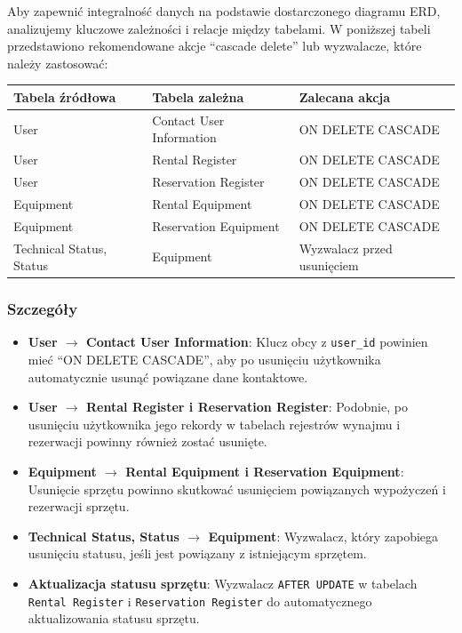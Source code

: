 \documentclass{article}
\begin{document}
Aby zapewnić integralność danych na podstawie dostarczonego diagramu ERD, analizujemy kluczowe zależności i relacje między tabelami. W poniższej tabeli przedstawiono rekomendowane akcje ``cascade delete'' lub wyzwalacze, które należy zastosować:

\begin{table}[h!]
    \centering
    \begin{tabular}{|p{4cm}|p{4cm}|p{6cm}|}
        \hline
        \textbf{Tabela źródłowa} & \textbf{Tabela zależna} & \textbf{Zalecana akcja} \\
        \hline
        User & Contact User Information & ON DELETE CASCADE \\
        \hline
        User & Rental Register & ON DELETE CASCADE \\
        \hline
        User & Reservation Register & ON DELETE CASCADE \\
        \hline
        Equipment & Rental Equipment & ON DELETE CASCADE \\
        \hline
        Equipment & Reservation Equipment & ON DELETE CASCADE \\
        \hline
        Technical Status, Status & Equipment & Wyzwalacz przed usunięciem \\
        \hline
    \end{tabular}
\end{table}

\subsubsection{Szczegóły}

\begin{itemize}
    \item \textbf{User $\rightarrow$ Contact User Information}: Klucz obcy z \texttt{user\_id} powinien mieć ``ON DELETE CASCADE'', aby po usunięciu użytkownika automatycznie usunąć powiązane dane kontaktowe.
    \item \textbf{User $\rightarrow$ Rental Register i Reservation Register}: Podobnie, po usunięciu użytkownika jego rekordy w tabelach rejestrów wynajmu i rezerwacji powinny również zostać usunięte.
    \item \textbf{Equipment $\rightarrow$ Rental Equipment i Reservation Equipment}: Usunięcie sprzętu powinno skutkować usunięciem powiązanych wypożyczeń i rezerwacji sprzętu.
    \item \textbf{Technical Status, Status $\rightarrow$ Equipment}: Wyzwalacz, który zapobiega usunięciu statusu, jeśli jest powiązany z istniejącym sprzętem.
    \item \textbf{Aktualizacja statusu sprzętu}: Wyzwalacz \texttt{AFTER UPDATE} w tabelach \texttt{Rental Register} i \texttt{Reservation Register} do automatycznego aktualizowania statusu sprzętu.
\end{itemize}
\end{document}
